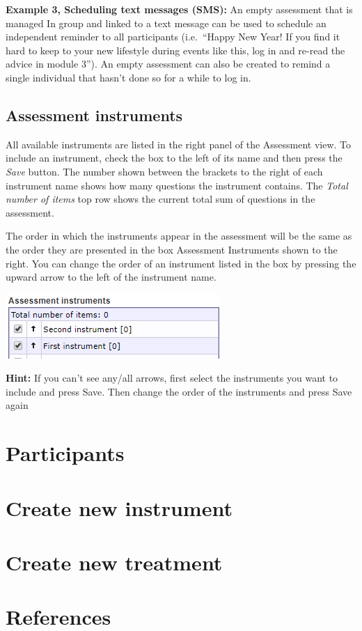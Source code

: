 \documentclass[]{book}
\begin{document}
\textbf{Example 3, Scheduling text messages (SMS):} An empty assessment that is managed In group and linked to a text message can be used to schedule an independent reminder to all participants (i.e.~``Happy New Year! If you find it hard to keep to your new lifestyle during events like this, log in and re-read the advice in module 3''). An empty assessment can also be created to remind a single individual that hasn't done so for a while to log in.

\hypertarget{assessment-instruments}{%
\section{Assessment instruments}\label{assessment-instruments}}

All available instruments are listed in the right panel of the Assessment view. To include an instrument, check the box to the left of its name and then press the \emph{Save} button. The number shown between the brackets to the right of each instrument name shows how many questions the instrument contains. The \emph{Total number of items} top row shows the current total sum of questions in the assessment.

The order in which the instruments appear in the assessment will be the same as the order they are presented in the box Assessment Instruments shown to the right. You can change the order of an instrument listed in the box by pressing the upward arrow to the left of the instrument name.

\includegraphics{images/assessment-instrument.png}

\textbf{Hint:} If you can't see any/all arrows, first select the instruments you want to include and press Save. Then change the order of the instruments and press Save again

\hypertarget{participants}{%
\chapter{Participants}\label{participants}}

\hypertarget{create-new-instrument}{%
\chapter{Create new instrument}\label{create-new-instrument}}

\hypertarget{create-new-treatment}{%
\chapter{Create new treatment}\label{create-new-treatment}}

\hypertarget{references}{%
\chapter{References}\label{references}}


\end{document}
